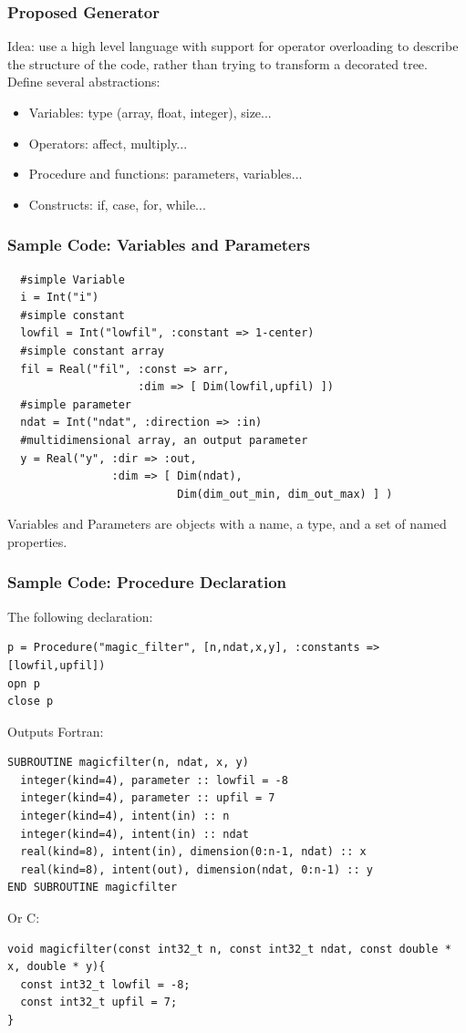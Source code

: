 \documentclass{beamer}
\begin{document}
\begin{frame}
\frametitle{Proposed Generator}
Idea: use a high level language with support for operator overloading to describe the structure of the code, rather than trying to transform a decorated tree.\\
Define several abstractions:
\begin{itemize}
\item Variables: type (array, float, integer), size...
\item Operators: affect, multiply...
\item Procedure and functions: parameters, variables...
\item Constructs: if, case, for, while...
\end{itemize}
\end{frame}

\begin{frame}[fragile]
\frametitle{Sample Code: Variables and Parameters}
\tiny
\lstset{style=BOAST}
\begin{lstlisting}
  #simple Variable
  i = Int("i")
  #simple constant
  lowfil = Int("lowfil", :constant => 1-center)
  #simple constant array
  fil = Real("fil", :const => arr,
                    :dim => [ Dim(lowfil,upfil) ])
  #simple parameter
  ndat = Int("ndat", :direction => :in)
  #multidimensional array, an output parameter
  y = Real("y", :dir => :out, 
                :dim => [ Dim(ndat), 
                          Dim(dim_out_min, dim_out_max) ] )
\end{lstlisting}
\normalsize
Variables and Parameters are objects with a name, a type, and a set of named properties.
\end{frame}

\begin{frame}[fragile]
\frametitle{Sample Code: Procedure Declaration}
The following declaration:
\tiny
\lstset{style=BOAST}
\begin{lstlisting}
p = Procedure("magic_filter", [n,ndat,x,y], :constants => [lowfil,upfil])
opn p
close p
\end{lstlisting}
\normalsize 
Outputs Fortran:
\tiny
\lstset{style=Fortran}
\begin{lstlisting}
SUBROUTINE magicfilter(n, ndat, x, y)
  integer(kind=4), parameter :: lowfil = -8
  integer(kind=4), parameter :: upfil = 7
  integer(kind=4), intent(in) :: n
  integer(kind=4), intent(in) :: ndat
  real(kind=8), intent(in), dimension(0:n-1, ndat) :: x
  real(kind=8), intent(out), dimension(ndat, 0:n-1) :: y
END SUBROUTINE magicfilter
\end{lstlisting}
\normalsize
Or C:
\tiny
\lstset{style=C}
\begin{lstlisting}
void magicfilter(const int32_t n, const int32_t ndat, const double * x, double * y){
  const int32_t lowfil = -8;
  const int32_t upfil = 7;
}
\end{lstlisting}
\end{frame}
\end{document}
